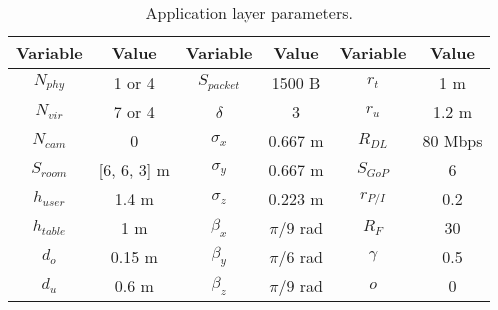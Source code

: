 \begin{table}[h]
    \centering
    \caption{Application layer parameters.}
    \label{tab:app_param}
    \begin{tabular}{|c|c|c|c|c|c|}
    \hline
    Variable    & Value       & Variable     & Value         & Variable  & Value   \\ \hline
    $N_{phy}$   & 1 or 4      & $S_{packet}$ & 1500 B        & $r_{t}$   & 1 m     \\ \hline
    $N_{vir}$   & 7 or 4      & $\delta$     & 3             & $r_{u}$   & 1.2 m   \\ \hline
    $N_{cam}$   & 0           & $\sigma_{x}$ & 0.667 m       & $R_{DL}$  & 80 Mbps \\ \hline
    $S_{room}$  & [6, 6, 3] m & $\sigma_{y}$ & 0.667 m       & $S_{GoP}$ & 6       \\ \hline
    $h_{user}$  & 1.4 m       & $\sigma_{z}$ & 0.223 m       & $r_{P/I}$ & 0.2     \\ \hline
    $h_{table}$ & 1 m         & $\beta_{x}$  & $\pi/9$ rad   & $R_{F}$   & 30      \\ \hline
    $d_{o}$     & 0.15 m      & $\beta_{y}$  & $\pi / 6$ rad & $\gamma$  & 0.5     \\ \hline
    $d_{u}$     & 0.6 m       & $\beta_{z}$  & $\pi/9$ rad   & $o$       & 0       \\ \hline
    \end{tabular}
\end{table}

